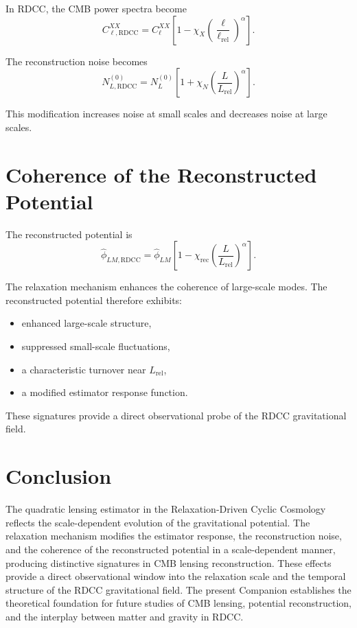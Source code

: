 \documentclass[11pt,a4paper]{article}
\begin{document}
In RDCC, the CMB power spectra become
\begin{equation}
    C_{\ell,\mathrm{RDCC}}^{XX}
    = C_{\ell}^{XX}
      \left[
        1 - \chi_{X}
        \left(\frac{\ell}{\ell_{\mathrm{rel}}}\right)^{\alpha}
      \right].
\end{equation}

The reconstruction noise becomes
\begin{equation}
    N_{L,\mathrm{RDCC}}^{(0)}
    = N_{L}^{(0)}
      \left[
        1 + \chi_{N}
        \left(\frac{L}{L_{\mathrm{rel}}}\right)^{\alpha}
      \right].
\end{equation}

This modification increases noise at small scales and decreases noise at large 
scales.
\section{Coherence of the Reconstructed Potential}

The reconstructed potential is
\begin{equation}
    \hat{\phi}_{LM,\mathrm{RDCC}}
    = \hat{\phi}_{LM}
      \left[
        1 - \chi_{\mathrm{rec}}
        \left(\frac{L}{L_{\mathrm{rel}}}\right)^{\alpha}
      \right].
\end{equation}

The relaxation mechanism enhances the coherence of large-scale modes. The 
reconstructed potential therefore exhibits:

\begin{itemize}
    \item enhanced large-scale structure,
    \item suppressed small-scale fluctuations,
    \item a characteristic turnover near $L_{\mathrm{rel}}$,
    \item a modified estimator response function.
\end{itemize}

These signatures provide a direct observational probe of the RDCC gravitational 
field.
\section{Conclusion}

The quadratic lensing estimator in the Relaxation-Driven Cyclic Cosmology reflects 
the scale-dependent evolution of the gravitational potential. The relaxation 
mechanism modifies the estimator response, the reconstruction noise, and the 
coherence of the reconstructed potential in a scale-dependent manner, producing 
distinctive signatures in CMB lensing reconstruction. These effects provide a 
direct observational window into the relaxation scale and the temporal structure of 
the RDCC gravitational field. The present Companion establishes the theoretical 
foundation for future studies of CMB lensing, potential reconstruction, and the 
interplay between matter and gravity in RDCC.


\nocite{*}

\end{document}
